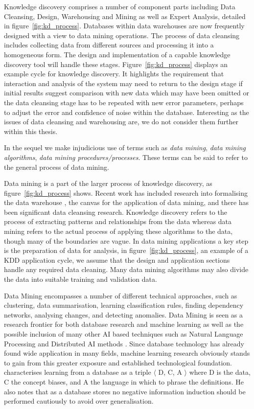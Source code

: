 \medskip
Knowledge discovery comprises a number of component parts including
Data Cleansing, Design, Warehousing and Mining as well as Expert
Analysis, detailed in figure~\ref{fig:kd_process}. Databases within
data warehouses are now frequently designed with a view to data mining
operations. The process of data cleansing includes collecting data
from different sources and processing it into a homogeneous form. The
design and implementation of a capable knowledge discovery tool will handle
these stages. Figure~\ref{fig:kd_process} displays an example cycle
for knowledge discovery. It highlights the requirement that
interaction and analysis of the system may need to return to the
design stage if initial results suggest comparison with new data which
may have been omitted or the data cleansing stage has to be repeated
with new error parameters, perhaps to adjust the error and confidence
of noise within the database.  Interesting as the issues of data
cleansing and warehousing are, we do not consider them further within
this thesis.
\medskip

In the sequel we make injudicious use of terms such as {\em data
mining}, {\em data mining algorithms}, {\em data mining
procedures/processes}. These terms can be said to refer to the general
process of data mining. 

\medskip

Data mining is a part of the larger process of knowledge discovery, as
figure~\ref{fig:kd_process} shows. Recent work has included
research into formalising the data warehouse \cite{hgmw95,inm96a}, the canvas for
the application of data mining, and there has been significant
data cleansing research.  Knowledge
discovery refers to the process of extracting patterns and relationships 
from the data whereas data mining refers to the actual process of applying
these algorithms to the data, though many of the boundaries are vague.
In data mining applications a key step is 
the preparation of data for analysis, in figure~\ref{fig:kd_process},
an example of a KDD application cycle, we assume that the
design and application sections handle any required data
cleaning. Many data mining algorithms may also divide the data into suitable training and validation data.

Data Mining encompasses a number of different
technical approaches, such as clustering, data summarisation, learning
classification rules, finding dependency networks, analysing changes,
and detecting anomalies.  Data Mining is seen as a research frontier
for both database research and machine learning as well as the  
possible inclusion of many other AI based techniques such as Natural Language 
Processing and Distributed AI methods \cite{kdd96}.  Since database 
technology has already found  
wide application in many fields, machine learning research obviously
stands to gain from this greater exposure and established
technological foundation. \cite{xiao95} characterises learning from a
database as a triple $\langle$ D, C, A $\rangle$ where 
D is the data, C the concept biases, and A the language in which to
phrase the definitions. He also notes that as a database stores no  
negative information induction should be performed cautiously to avoid
over generalisation.
\medskip

